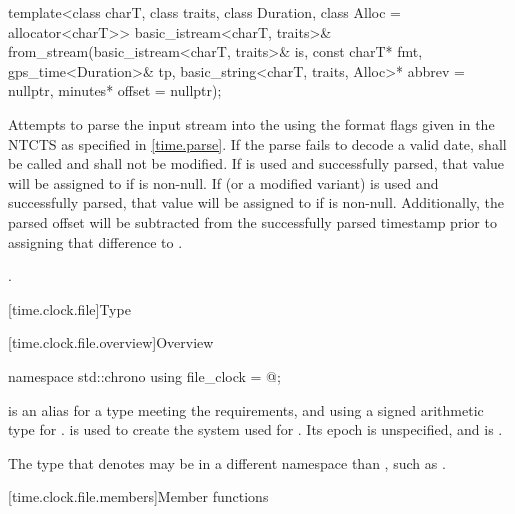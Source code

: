 %
\begin{itemdecl}
template<class charT, class traits, class Duration, class Alloc = allocator<charT>>
  basic_istream<charT, traits>&
    from_stream(basic_istream<charT, traits>& is, const charT* fmt,
                gps_time<Duration>& tp, basic_string<charT, traits, Alloc>* abbrev = nullptr,
                minutes* offset = nullptr);
\end{itemdecl}

\begin{itemdescr}
\pnum
\effects
Attempts to parse the input stream 
into the   using
the format flags given in the NTCTS 
as specified in \ref{time.parse}.
If the parse fails to decode a valid date,
 shall be called
and  shall not be modified.
If  is used and successfully parsed,
that value will be assigned to  if  is non-null.
If  (or a modified variant) is used and successfully parsed,
that value will be assigned to  if  is non-null.
Additionally, the parsed offset will be subtracted from
the successfully parsed timestamp prior to assigning that difference to .

\pnum
\returns
{}.
\end{itemdescr}

[time.clock.file]{Type }

[time.clock.file.overview]{Overview}
%

\begin{codeblock}
namespace std::chrono {
  using file_clock = @\seebelow@;
}
\end{codeblock}

\pnum
{} is an alias for a type
meeting the  requirements, and
using a signed arithmetic type for .
 is used to create the  system
used for .
Its epoch is unspecified, and
 is .
\begin{note}
The type that  denotes may be
in a different namespace than ,
such as .
\end{note}

[time.clock.file.members]{Member functions}

